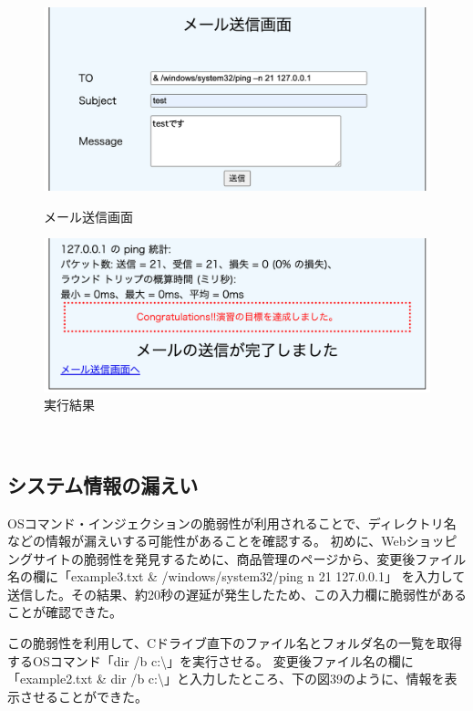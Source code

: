 \documentclass[dvipdfmx,autodetect-engine,titlepage]{jsarticle}
\begin{document}
\begin{figure}[H]
  \centering
  \begin{minipage}[b]{0.45\linewidth}
  \begin{center}
    \includegraphics[keepaspectratio,scale=0.3]{os1.png}
    \end{center}
    \caption{メール送信画面}
  \end{minipage}
  \begin{minipage}[b]{0.45\linewidth}
  \begin{center}
    \includegraphics[keepaspectratio,scale=0.3]{os2.png}
    \end{center}
    \caption{実行結果}
  \end{minipage}
\end{figure}
　

\subsection{システム情報の漏えい}
OSコマンド・インジェクションの脆弱性が利用されることで、ディレクトリ名などの情報が漏えいする可能性があることを確認する。
初めに、Webショッピングサイトの脆弱性を発見するために、商品管理のページから、変更後ファイル名の欄に「example3.txt \& /windows/system32/ping \-n 21 127.0.0.1」
を入力して送信した。その結果、約20秒の遅延が発生したため、この入力欄に脆弱性があることが確認できた。

この脆弱性を利用して、Cドライブ直下のファイル名とフォルダ名の一覧を取得するOSコマンド「dir /b c:\textbackslash 」を実行させる。
変更後ファイル名の欄に「example2.txt \& dir /b c:\textbackslash 」と入力したところ、下の図39のように、情報を表示させることができた。\\
\end{document}
